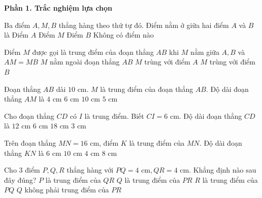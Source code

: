 \textbf{Phần 1. Trắc nghiệm lựa chọn}

\begin{ex} %
Ba điểm $A, M, B$ thẳng hàng theo thứ tự đó. Điểm nằm ở giữa hai điểm $A$ và $B$ là
\choice
{Điểm $A$}
{\True Điểm $M$}
{Điểm $B$}
{Không có điểm nào}
\end{ex}

\begin{ex} %
Điểm $M$ được gọi là trung điểm của đoạn thẳng $AB$ khi
\choice
{\True $M$ nằm giữa $A, B$ và $AM = MB$}
{$M$ nằm ngoài đoạn thẳng $AB$}
{$M$ trùng với điểm $A$}
{$M$ trùng với điểm $B$}
\end{ex}

\begin{ex} %
Đoạn thẳng $AB$ dài $10\text{ cm}$. $M$ là trung điểm của đoạn thẳng $AB$. Độ dài đoạn thẳng $AM$ là
\choice
{$4\text{ cm}$}
{$6\text{ cm}$}
{$10\text{ cm}$}
{\True $5\text{ cm}$}
\end{ex}

\begin{ex} %
Cho đoạn thẳng $CD$ có $I$ là trung điểm. Biết $CI = 6\text{ cm}$. Độ dài đoạn thẳng $CD$ là
\choice
{\True $12\text{ cm}$}
{$6\text{ cm}$}
{$18\text{ cm}$}
{$3\text{ cm}$}
\end{ex}

\begin{ex} %
Trên đoạn thẳng $MN = 16\text{ cm}$, điểm $K$ là trung điểm của $MN$. Độ dài đoạn thẳng $KN$ là
\choice
{$6\text{ cm}$}
{$10\text{ cm}$}
{$4\text{ cm}$}
{\True $8\text{ cm}$}
\end{ex}

\begin{ex} %
Cho 3 điểm $P, Q, R$ thẳng hàng với $PQ = 4\text{ cm}, QR = 4\text{ cm}$. Khẳng định nào sau đây đúng?
\choice
{$P$ là trung điểm của $QR$}
{\True $Q$ là trung điểm của $PR$}
{$R$ là trung điểm của $PQ$}
{$Q$ không phải trung điểm của $PR$}
\end{ex}

